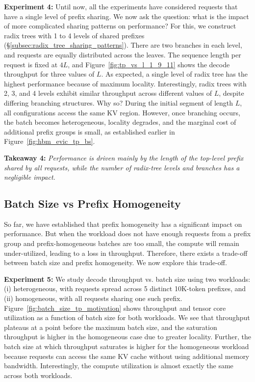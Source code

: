 \textbf{Experiment 4:} Until now, all the experiments have considered requests that have a single level of prefix sharing. We now ask the question: what is the impact of more complicated sharing patterns on performance? For this, we construct radix trees with 1 to 4 levels of shared prefixes (\S\ref{subsec:radix_tree_sharing_patterns}). There are two branches in each level, and requests are equally distributed across the leaves. The sequence length per request is fixed at $4L$, and Figure~\ref{fig:tp_vs_l_1_9_11} shows the decode throughput for three values of $L$. As expected, a single level of radix tree has the highest performance because of maximum locality. Interestingly, radix trees with 2, 3, and 4 levels exhibit similar throughput across different values of $L$, despite differing branching structures. Why so? During the initial segment of length $L$, all configurations access the same KV region. However, once branching occurs, the batch becomes heterogeneous, locality degrades, and the marginal cost of additional prefix groups is small, as established earlier in Figure~\ref{fig:hbm_evic_tp_bs}.

\textbf{Takeaway 4:} \textit{Performance is driven mainly by the length of the top-level prefix shared by all requests, while the number of radix-tree levels and branches has a negligible impact.}



\vspace{-10pt}

\subsection{Batch Size vs Prefix Homogeneity}
\label{subsec:batch_size_vs_prefix_homogeneity}
So far, we have established that prefix homogeneity has a significant impact on performance. But when the workload does not have enough requests from a prefix group and prefix-homogeneous batches are too small, the compute will remain under-utilized, leading to a loss in throughput. Therefore, there exists a trade-off between batch size and prefix homogeneity. We now explore this trade-off.

\textbf{Experiment 5:} We study decode throughput vs. batch size using two workloads: (i) heterogeneous, with requests spread across 5 distinct 10K-token prefixes, and (ii) homogeneous, with all requests sharing one such prefix. Figure~\ref{fig:batch_size_tp_motivation} shows throughput and tensor core utilization as a function of batch size for both workloads. We see that throughput plateaus at a point before the maximum batch size, and the saturation throughput is higher in the homogeneous case due to greater locality. Further, the batch size at which throughput saturates is higher for the homogeneous workload because requests can access the same KV cache without using additional memory bandwidth. Interestingly, the compute utilization is almost exactly the same across both workloads.

